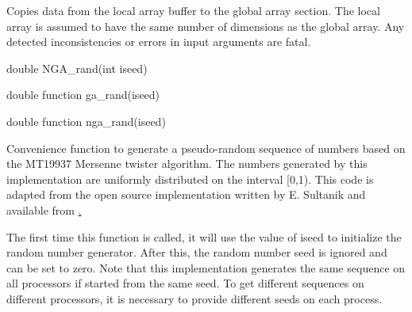 \documentclass[12pt]{article}
\begin{document}
\ncoll

\begin{desc}

Copies data from the local array buffer to the global array section. The local
array is assumed to have the same number of dimensions as the global array.
Any detected inconsistencies or errors in input arguments are fatal.

\end{desc}


\begin{capi}
\begin{ccode}
double NGA_rand(int iseed)
\end{ccode}
\begin{funcargs}
\end{funcargs}
\end{capi}

\begin{f2dapi}
\begin{fcode}
double function ga_rand(iseed)
\end{fcode}
\begin{funcargs}
\end{funcargs}
\end{f2dapi}

\begin{fapi}
\begin{fcode}
double function nga_rand(iseed)
\end{fcode}
\begin{funcargs}
\end{funcargs}
\end{fapi}

\ncoll

\begin{desc}

Convenience function to generate a pseudo-random sequence of numbers based on
the MT19937 Mersenne twister algorithm. The numbers generated by this
implementation are uniformly distributed on the interval [0,1). This code is
adapted from the open source implementation written by E. Sultanik and available
from \href{https://github.com/ESultanik/mtwister}.

The first time this function is called, it will use the value of iseed to
initialize the random number generator. After this, the random number seed is
ignored and can be set to zero. Note that this implementation generates the
same sequence on all processors if started from the same seed. To get different
sequences on different processors, it is necessary to provide different seeds
on each process.

\end{desc}
\end{document}
